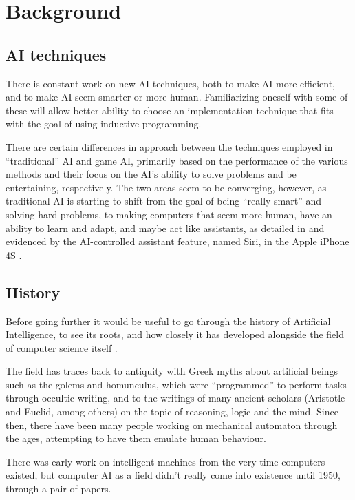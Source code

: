 \cleardoublepage
\chapter{Background}
\label{rel}
\section{AI techniques}
\label{cha:ai-techniques}

There is constant work on new AI techniques, both to make AI more efficient, and
to make AI seem smarter or more human. Familiarizing oneself with some of these
will allow better ability to choose an implementation technique that fits with
the goal of using inductive programming.

There are certain differences in approach between the techniques employed in
``traditional'' AI and game AI, primarily based on the performance of the
various methods and their focus on the AI's ability to solve problems and be
entertaining, respectively. The two areas seem to be converging, however, as
traditional AI is starting to shift from the goal of being ``really smart'' and
solving hard problems, to making computers that seem more human, have an ability
to learn and adapt, and maybe act like assistants, as detailed in
\citet[][]{ramos2008guest} and evidenced by the AI-controlled assistant feature,
named Siri, in the Apple iPhone 4S \citep{apple2011siri}.

\section{History}
\label{sec:trad-ai-history}

Before going further it would be useful to go through the history of Artificial
Intelligence, to see its roots, and how closely it has developed alongside the
field of computer science itself \citep{luger2005artificial,buchanan2002brief}.

The field has traces back to antiquity with Greek myths about artificial beings
such as the golems and homunculus, which were ``programmed'' to perform tasks
through occultic writing, and to the writings of many ancient scholars
(Aristotle and Euclid, among others) on the topic of reasoning, logic and the
mind. Since then, there have been many people working on mechanical automaton
through the ages, attempting to have them emulate human behaviour.

There was early work on intelligent machines from the very time computers
existed, but computer AI as a field didn't really come into existence until
1950, through a pair of papers.

